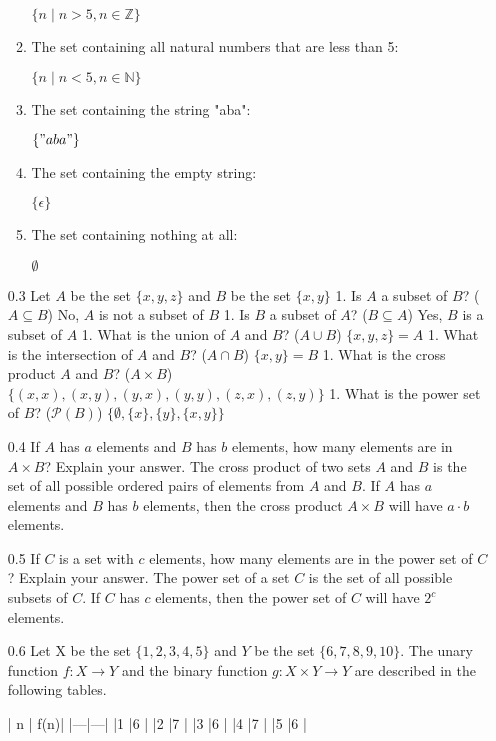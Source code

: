 \documentclass[12pt, a4paper]{article}
\begin{document}
\begin{enumerate}
\begin{enumerate}
    $\{n \mid n > 5, n \in \mathbb{Z}\}$
\item  The set containing all natural numbers that are less than 5:

    $\{n \mid n < 5, n \in \mathbb{N}\}$
\item The set containing the string "aba":

    $\{"aba"\}$
\item The set containing the empty string:

    $\{\epsilon\}$
\item The set containing nothing at all:

    $\emptyset$
\end{enumerate}

    \item[0.3]
Let $A$ be the set $\{x,y,z\}$ and $B$ be the set $\{x,y\}$
1. Is $A$ a subset of $B$? ($A \subseteq B$) 
    No, $A$ is not a subset of $B$
1. Is $B$ a subset of $A$? ($B \subseteq A$) 
    Yes, $B$ is a subset of $A$
1. What is the union of $A$ and $B$? ($A \cup B$) 
    $\{x,y,z\} = A$
1. What is the intersection of $A$ and $B$? ($A \cap B$) 
    $\{x,y\} = B$
1. What is the cross product $A$ and $B$? ($A \times B$) 
    $\{(x,x), (x,y), (y,x), (y,y), (z,x), (z,y)\}$
1. What is the power set of $B$? ($\mathcal{P}(B)$) 
    $\{\emptyset, \{x\}, \{y\}, \{x,y\}\}$

    \item[0.4]
If $A$ has  $a$  elements and  $B$  has  $b$  elements, how many elements are in  $A \times B$? 
Explain your answer.
The cross product of two sets $A$ and $B$ is the set of all possible ordered pairs of elements from $A$ and $B$. If $A$ has $a$ elements and $B$ has $b$ elements, then the cross product $A \times B$ will have $a \cdot b$ elements.

    \item[0.5]
If $C$ is a set with $c$ elements, how many elements are in the power set of $C$? 
Explain your answer.
The power set of a set $C$ is the set of all possible subsets of $C$. If $C$ has $c$ elements, then the power set of $C$ will have $2^c$ elements.

    \item[0.6]
Let X be the set $\{1, 2, 3, 4, 5\}$ and $Y$ be the set $\{6, 7, 8, 9, 10\}$. The unary function $f: X \to Y$ and the binary function $g: X \times Y \to Y$ are described in the following tables.

| n | f(n)| 
|---|---|
|1 |6 |
|2 |7 |
|3 |6 |
|4 |7 |
|5 |6 |


\end{enumerate}
\end{document}
